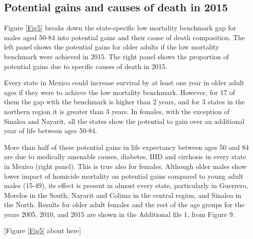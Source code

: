 \documentclass{bmcart}
\begin{document}
\subsection*{Potential gains and causes of death in 2015}

Figure \ref{Fig5} breaks down the state-specific low mortality benchmark gap for males aged 50-84 into potential gains and their cause of death composition. The left panel shows the potential gains for older adults if the low mortality benchmark were achieved in 2015. The right panel shows the proportion of potential gains due to specific causes of death in 2015.

Every state in Mexico could increase survival by at least one year in older adult ages if they were to achieve the low mortality benchmark. However, for 17 of them the gap with the benchmark is higher than 2 years, and for 3 states in the northern region it is greater than 3 years. In females, with the exception of Sinaloa and Nayarit, all the states show the potential to gain over an additional year of life between ages 50-84.

More than half of these potential gains in life expectancy between ages 50 and 84 are due to medically amenable causes, diabetes, IHD and cirrhosis in every state in Mexico (right panel). This is true also for females. Although older males show lower impact of homicide mortality on potential gains compared to young adult males (15-49), its effect is present in almost every state, particularly in Guerrero, Morelos in the South, Nayarit and Colima in the central region, and Sinaloa in the North. Results for older adult females and the rest of the age groups for the years 2005, 2010, and 2015 are shown in the Additional file 1, from Figure 9. \\

\begin{center}
[Figure \ref{Fig5} about here]
\end{center}
\end{document}
